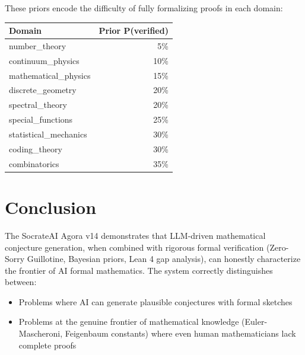 \documentclass[12pt,a4paper]{article}
\begin{document}
These priors encode the difficulty of fully formalizing proofs in each domain:

\begin{center}
\begin{tabular}{lr}
\toprule
\textbf{Domain} & \textbf{Prior P(verified)} \\
\midrule
number\_theory & 5\% \\
continuum\_physics & 10\% \\
mathematical\_physics & 15\% \\
discrete\_geometry & 20\% \\
spectral\_theory & 20\% \\
special\_functions & 25\% \\
statistical\_mechanics & 30\% \\
coding\_theory & 30\% \\
combinatorics & 35\% \\
\bottomrule
\end{tabular}
\end{center}

\section{Conclusion}

The SocrateAI Agora v14 demonstrates that LLM-driven mathematical conjecture
generation, when combined with rigorous formal verification (Zero-Sorry Guillotine,
Bayesian priors, Lean 4 gap analysis), can honestly characterize the frontier of
AI formal mathematics. The system correctly distinguishes between:
\begin{itemize}
  \item Problems where AI can generate plausible conjectures with formal sketches
  \item Problems at the genuine frontier of mathematical knowledge (Euler-Mascheroni,
    Feigenbaum constants) where even human mathematicians lack complete proofs
\end{itemize}
\end{document}
